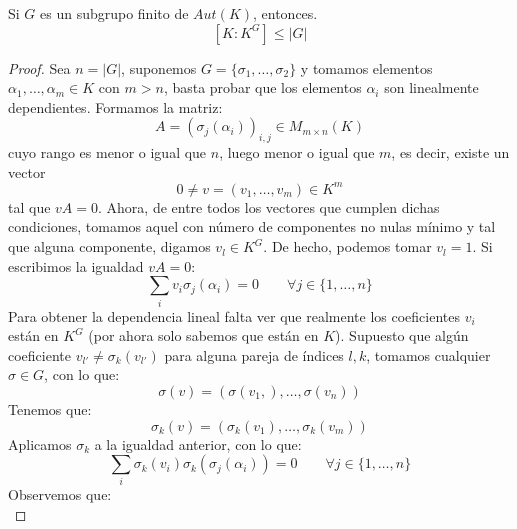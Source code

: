 \begin{prop}[Artin]
    Si $G$ es un subgrupo finito de $Aut(K)$, entonces.
    \begin{equation*}
        \left[K:K^G\right] \leq |G|
    \end{equation*}
    \begin{proof}
        Sea $n=|G|$, suponemos $G = \{\sigma_1, \ldots, \sigma_2\}$ y tomamos elementos $\alpha_1,\ldots,\alpha_m \in K$ con $m>n$, basta probar que los elementos $\alpha_i$ son linealmente dependientes. Formamos la matriz:
        \begin{equation*}
            A = (\sigma_{j}(\alpha_i))_{i,j} \in  M_{m\times n}(K)
        \end{equation*}
        cuyo rango es menor o igual que $n$, luego menor o igual que $m$, es decir, existe un vector
        \begin{equation*}
            0\neq v = (v_1, \ldots, v_m) \in K^m
        \end{equation*}
        tal que $vA = 0$. Ahora, de entre todos los vectores que cumplen dichas condiciones, tomamos aquel con número de componentes no nulas mínimo y tal que alguna componente, digamos $v_l \in K^G$. De hecho, podemos tomar $v_l = 1$. Si escribimos la igualdad $vA = 0$:
        \begin{equation*}
            \sum_i v_i \sigma_j(\alpha_i) = 0 \qquad \forall j \in \{1,\ldots,n\}
        \end{equation*}
        Para obtener la dependencia lineal falta ver que realmente los coeficientes $v_i$ están en $K^G$ (por ahora solo sabemos que están en $K$). Supuesto que algún coeficiente $v_{l'} \neq \sigma_k(v_{l'})$ para alguna pareja de índices $l,k$, tomamos cualquier $\sigma\in G$, con lo que:
        \begin{equation*}
            \sigma(v) = (\sigma(v_1,), \ldots, \sigma(v_n))
        \end{equation*}
        Tenemos que:
        \begin{equation*}
            \sigma_k(v) = (\sigma_k(v_1), \ldots, \sigma_k(v_m))
        \end{equation*}
        Aplicamos $\sigma_k$ a la igualdad anterior, con lo que:
        \begin{equation*}
            \sum_i \sigma_k(v_i) \sigma_k(\sigma_j(\alpha_i)) = 0 \qquad \forall j \in \{1,\ldots,n\}
        \end{equation*}
        Observemos que:
        \begin{equation*}

\end{equation*}
\end{proof}
\end{prop}
